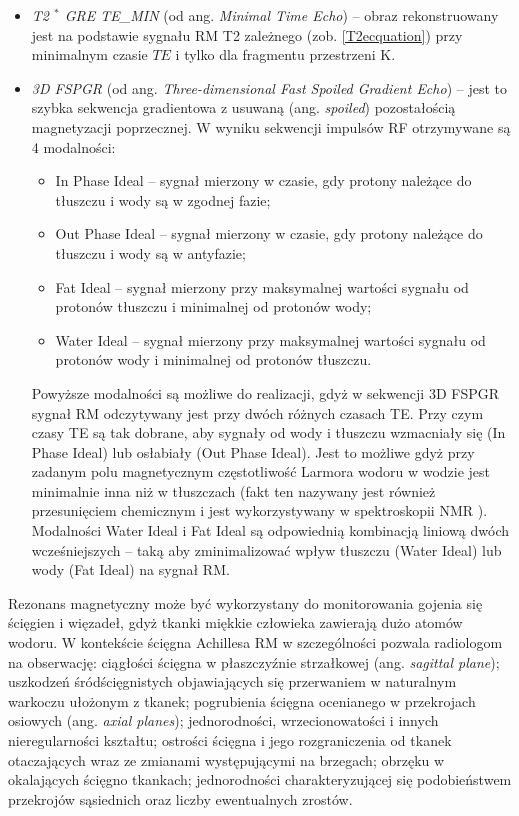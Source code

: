 \begin{itemize}
	\item \textit{T2 $^\ast$ GRE TE\_MIN} (od ang. \textit{Minimal Time Echo}) -- obraz rekonstruowany jest na podstawie sygnału RM T2 zależnego (zob. \ref{T2ecquation}) przy minimalnym czasie $TE$ i tylko dla fragmentu przestrzeni K. 
	\item \textit{3D FSPGR} (od ang. \textit{Three-dimensional Fast Spoiled Gradient Echo}) -- jest to szybka sekwencja gradientowa z usuwaną (ang. \textit{spoiled}) pozostałością magnetyzacji poprzecznej. W wyniku sekwencji impulsów RF otrzymywane są 4 modalności: 
	\begin{itemize}
		\item In Phase Ideal -- sygnał mierzony w czasie, gdy protony należące do tłuszczu i wody są w zgodnej fazie;
		\item Out Phase Ideal -- sygnał mierzony w czasie, gdy protony należące do tłuszczu i wody są w antyfazie;
		\item Fat Ideal -- sygnał mierzony przy maksymalnej wartości sygnału od protonów tłuszczu i minimalnej od protonów wody;
		\item Water Ideal -- sygnał mierzony przy maksymalnej wartości sygnału od protonów wody i minimalnej od protonów tłuszczu.
	\end{itemize}
	Powyższe modalności są możliwe do realizacji, gdyż w sekwencji 3D FSPGR sygnał RM odczytywany jest przy dwóch różnych czasach TE. Przy czym czasy TE są tak dobrane, aby sygnały od wody i tłuszczu wzmacniały się (In Phase Ideal) lub osłabiały (Out Phase Ideal). Jest to możliwe gdyż przy zadanym polu magnetycznym częstotliwość Larmora wodoru w wodzie jest minimalnie inna niż w tłuszczach (fakt ten nazywany jest również przesunięciem chemicznym i jest wykorzystywany w spektroskopii NMR \cite{lide2006crc}). Modalności Water Ideal i Fat Ideal są odpowiednią kombinacją liniową dwóch wcześniejszych -- taką aby zminimalizować wpływ tłuszczu (Water Ideal) lub wody (Fat Ideal) na sygnał RM.
\end{itemize}

Rezonans magnetyczny może być wykorzystany do monitorowania gojenia się ścięgien i więzadeł, gdyż tkanki miękkie człowieka zawierają dużo atomów wodoru. W kontekście ścięgna Achillesa RM w szczególności pozwala radiologom na obserwację: ciągłości ścięgna w płaszczyźnie strzałkowej (ang. \textit{sagittal plane}); uszkodzeń śródścięgnistych objawiających się przerwaniem w naturalnym warkoczu ułożonym z tkanek; pogrubienia ścięgna ocenianego w przekrojach osiowych (ang. \textit{axial planes}); jednorodności, wrzecionowatości i innych nieregularności kształtu; ostrości ścięgna i jego rozgraniczenia od tkanek otaczających wraz ze zmianami występującymi na brzegach; obrzęku w okalających ścięgno tkankach; jednorodności charakteryzującej się podobieństwem przekrojów sąsiednich oraz liczby ewentualnych zrostów.

